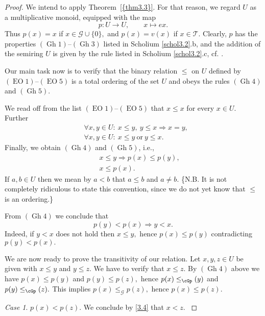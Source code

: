 \documentclass [12pt,a4paper,reqno]{amsart}
\begin{document}
\begin{proof}
We intend to apply {Theorem~\ref{{thm3.3}}}. For that reason, we regard $U$
as a multiplicative monoid, equipped with the map $$p:U\to U,
\qquad  x\mapsto ex.$$ Thus $p(x)=x$ if $x\in {\mathcal G} \cup\{0\},$ and
$p(x)=v(x)$ if $x\in {\mathcal T}.$ Clearly, $p$ has the properties
 $({\operatorname{Gh}}1)$--$({\operatorname{Gh}}3)$ listed in Scholium \ref{schol3.2}.b, and the addition
 of the semiring $U$ is given by the rule listed in Scholium
 \ref{schol3.2}.c, cf. \cite[Construction 3.16]{IKR1}.

 Our main task now is to verify that the binary relation $\le$ on
 $U$ defined by $({\operatorname{EO}}1)$--$({\operatorname{EO}}5)$ is a total ordering of the set $U$ and
 obeys the rules $({\operatorname{Gh}}4)$ and $({\operatorname{Gh}}5)$.

 We read off from the list $({\operatorname{EO}}1)$--$({\operatorname{EO}}5)$ that $x\le x$ for every
 $x\in U.$ Further
 \begin{align*}&\forall x,y\in U: \ x\le y,\ y\le x\Rightarrow
 x=y,\\
 &\forall x,y\in U: \ x\le y\  \text{or} \ y\le x.
 \end{align*}
 Finally, we obtain $({\operatorname{Gh}}4)$ and $({\operatorname{Gh}}5)$, i.e.,
 \begin{align*}
& \quad  x\le y\Rightarrow p(x)\le p(y),  \\
& \quad   x\le p(x).
\end{align*}
If $a,b\in U$ then we mean by $a<b$ that $a\le b$ and $a\ne b.$
\{N.B. It is not completely ridiculous to state this convention,
since we do not yet know that $\le$ is an ordering.\}

From $({\operatorname{Gh}}4)$ we conclude that
\begin{equation}\label{3.4}
p(y)<p(x)\Rightarrow y<x.\end{equation} Indeed, if $y<x$ does not
hold then $x\le y,$ hence $p(x)\le p(y)$ contradicting
$p(y)<p(x).$

We are now ready to prove the transitivity of our relation. Let
$x,y,z\in U$ be given with $x\le y$ and $y\le z.$ We have to
verify that $x\le z.$ By $({\operatorname{Gh}}4)$ above we have $p(x)\le p(y)$ and
$p(y)\le p(z),$ hence $p(x)\le_\cGp(y)$ and
$p(y)\le_\cGp(z).$ This implies $p(x)\le_{\mathcal G} p(z),$ hence
$p(x)\le p(z).$ {\vskip 1.5mm \noindent}

\textit{Case 1}. $p(x)<p(z).$ We conclude by \eqref{3.4} that $x<
z.$  {\vskip 1.5mm \noindent}


\end{proof}
\end{document}
